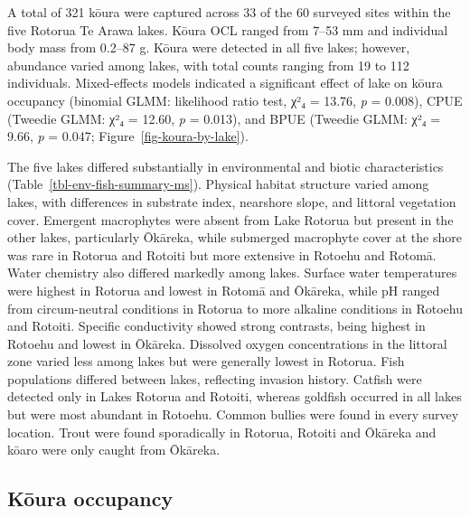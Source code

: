 \documentclass[
  letterpaper,
  DIV=11,
  numbers=noendperiod]{scrartcl}
\begin{document}
A total of 321 kōura were captured across 33 of the 60 surveyed sites
within the five Rotorua Te Arawa lakes. Kōura OCL ranged from 7--53 mm
and individual body mass from 0.2--87 g. Kōura were detected in all five
lakes; however, abundance varied among lakes, with total counts ranging
from 19 to 112 individuals. Mixed-effects models indicated a significant
effect of lake on kōura occupancy (binomial GLMM: likelihood ratio test,
χ²₄ = 13.76, \emph{p} = 0.008), CPUE (Tweedie GLMM: χ²₄ = 12.60,
\emph{p} = 0.013), and BPUE (Tweedie GLMM: χ²₄ = 9.66, \emph{p} = 0.047;
Figure~\ref{fig-koura-by-lake}).

The five lakes differed substantially in environmental and biotic
characteristics (Table~\ref{tbl-env-fish-summary-ms}). Physical habitat
structure varied among lakes, with differences in substrate index,
nearshore slope, and littoral vegetation cover. Emergent macrophytes
were absent from Lake Rotorua but present in the other lakes,
particularly Ōkāreka, while submerged macrophyte cover at the shore was
rare in Rotorua and Rotoiti but more extensive in Rotoehu and Rotomā.
Water chemistry also differed markedly among lakes. Surface water
temperatures were highest in Rotorua and lowest in Rotomā and Ōkāreka,
while pH ranged from circum-neutral conditions in Rotorua to more
alkaline conditions in Rotoehu and Rotoiti. Specific conductivity showed
strong contrasts, being highest in Rotoehu and lowest in Ōkāreka.
Dissolved oxygen concentrations in the littoral zone varied less among
lakes but were generally lowest in Rotorua. Fish populations differed
between lakes, reflecting invasion history. Catfish were detected only
in Lakes Rotorua and Rotoiti, whereas goldfish occurred in all lakes but
were most abundant in Rotoehu. Common bullies were found in every survey
location. Trout were found sporadically in Rotorua, Rotoiti and Ōkāreka
and kōaro were only caught from Ōkāreka.

\subsection{Kōura occupancy}\label{kux14dura-occupancy}
\end{document}
